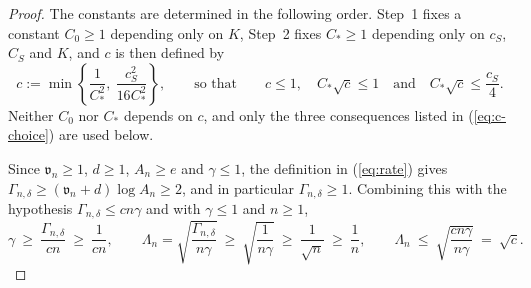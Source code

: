 \documentclass{article} %
\begin{document}
\begin{proof}
The constants are determined in the following order.  Step~1 fixes a constant $C_0\ge1$ depending only on $K$, Step~2 fixes $C_\ast\ge1$ depending only on $c_S$, $C_S$ and $K$, and $c$ is then defined by
\begin{equation}
  c:=\min\left\{\frac{1}{C_\ast^{2}},\ \frac{c_S^2}{16C_\ast^{2}}\right\},
  \qquad\text{so that}\qquad
  c\le1,\quad C_\ast\sqrt{c}\le1
  \quad\text{and}\quad C_\ast\sqrt{c}\le\frac{c_S}{4} .
  \label{eq:c-choice}
\end{equation}
Neither $C_0$ nor $C_\ast$ depends on $c$, and only the three consequences listed in (\ref{eq:c-choice}) are used below.

Since $\mathfrak{v}_n\ge1$, $d\ge1$, $A_n\ge e$ and $\gamma\le1$, the definition in (\ref{eq:rate}) gives $\Gamma_{n,\delta}\ge(\mathfrak{v}_n+d)\log A_n\ge2$, and in particular $\Gamma_{n,\delta}\ge1$.  Combining this with the hypothesis $\Gamma_{n,\delta}\le cn\gamma$ and with $\gamma\le1$ and $n\ge1$,
\begin{equation}
  \gamma\ \ge\ \frac{\Gamma_{n,\delta}}{cn}\ \ge\ \frac{1}{cn},
  \qquad
  \Lambda_n=\sqrt{\frac{\Gamma_{n,\delta}}{n\gamma}}\ \ge\ \sqrt{\frac{1}{n\gamma}}\ \ge\ \frac{1}{\sqrt{n}}\ \ge\ \frac{1}{n},
  \qquad
  \Lambda_n\ \le\ \sqrt{\frac{cn\gamma}{n\gamma}}\ =\ \sqrt{c} .
  \label{eq:lambda-range}
\end{equation}


\end{proof}
\end{document}
